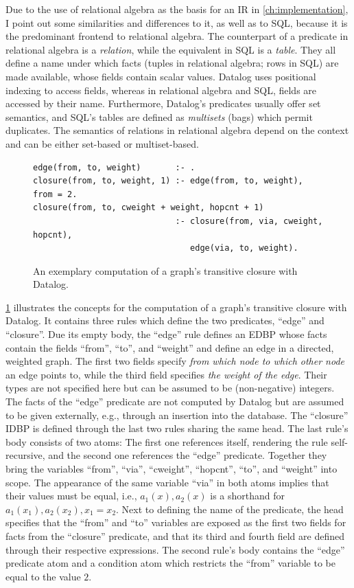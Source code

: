 Due to the use of relational algebra as the basis for an \ac{IR}
in \ref{ch:implementation}, I point out some similarities and differences to it,
as well as to SQL, because it is the predominant frontend to relational algebra.
The counterpart of a predicate in relational algebra is a \emph{relation}, while
the equivalent in SQL is a \emph{table}.
They all define a name under which facts (tuples in relational algebra;
rows in SQL) are made available, whose fields contain scalar values.
Datalog uses positional indexing to access fields, whereas in
relational algebra and SQL, fields are accessed by their name.
Furthermore, Datalog's predicates usually offer set semantics,
and SQL's tables are defined as \emph{multisets} (bags) which permit duplicates.
The semantics of relations in relational algebra depend on the context and
can be either set-based or multiset-based.

\begin{figure}[htpb]
    \centering
    \begin{lstlisting}[keepspaces]
edge(from, to, weight)       :- .
closure(from, to, weight, 1) :- edge(from, to, weight), from = 2.
closure(from, to, cweight + weight, hopcnt + 1)
                             :- closure(from, via, cweight, hopcnt),
                                edge(via, to, weight).\end{lstlisting}
    \caption{An exemplary computation of a graph's transitive closure with Datalog.}\label{code:trans-closure-datalog}
\end{figure}

\ref{code:trans-closure-datalog} illustrates the concepts for the
computation of a graph's transitive closure with Datalog.
It contains three rules which define the two predicates, ``edge'' and ``closure''.
Due its empty body, the ``edge'' rule defines an \ac{EDBP} whose facts
contain the fields ``from'', ``to'', and ``weight'' and define an edge
in a directed, weighted graph.
The first two fields specify \emph{from which node to which other node} an edge
points to, while the third field specifies \emph{the weight of the edge}.
Their types are not specified here but can be assumed to be (non-negative) integers.
The facts of the ``edge'' predicate are not computed by Datalog but
are assumed to be given externally, e.g., through an insertion into the database.
The ``closure'' \ac{IDBP} is defined through the last two rules sharing
the same head.
The last rule's body consists of two atoms: The first one references itself,
rendering the rule self-recursive, and the second one references the ``edge'' predicate.
Together they bring the variables ``from'', ``via'', ``cweight'', ``hopcnt'',
``to'', and ``weight'' into scope.
The appearance of the same variable ``via'' in both atoms implies that their
values must be equal, i.e.,
\(a_1(x), a_2(x)\) is a shorthand for \(a_1(x_1), a_2(x_2), x_1 = x_2\).
Next to defining the name of the predicate, the head specifies that the ``from''
and ``to'' variables are exposed as the first two fields for facts from the ``closure'' predicate,
and that its third and fourth field are defined through their respective expressions.
The second rule's body contains the ``edge'' predicate atom and a condition
atom which restricts the ``from'' variable to be equal to the value \(2\).

